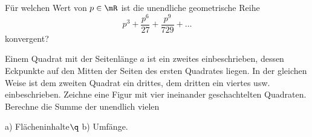 \documentclass[%
11pt,%
twoside,%
titlepage,%
german,%
headsepline%
]{scrartcl}
\begin{document}
\begin{ueb}
F\"ur welchen Wert von $p\in\mR$ ist die unendliche geometrische Reihe
$$p^3+\frac{p^6}{27}+\frac{p^9}{729}+\dots$$
konvergent?
\end{ueb}

\begin{ueb}
Einem Quadrat mit der Seitenl\"ange $a$ ist ein zweites einbeschrieben, dessen Eckpunkte auf den Mitten der Seiten des ersten Quadrates liegen. In der gleichen Weise ist dem zweiten Quadrat ein drittes, dem dritten ein viertes usw. einbeschrieben. Zeichne eine Figur mit vier ineinander geschachtelten Quadraten. Berechne die Summe der unendlich vielen

a) Fl\"acheninhalte$\q$ b) Umf\"ange.
\end{ueb}
\end{document}
